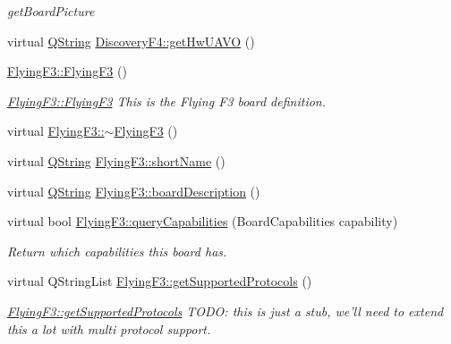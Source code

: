 \begin{DoxyCompactItemize}
\begin{DoxyCompactList}\small\item\em get\-Board\-Picture \end{DoxyCompactList}\item 
virtual \hyperlink{group___u_a_v_objects_plugin_gab9d252f49c333c94a72f97ce3105a32d}{\-Q\-String} \hyperlink{group___boards___stm_gad4fb3147a8ceb8b1106048d7b44d92e9}{\-Discovery\-F4\-::get\-Hw\-U\-A\-V\-O} ()
\item 
\hyperlink{group___boards___stm_ga9b44241cce2e1f0737c9fef2eace273b}{\-Flying\-F3\-::\-Flying\-F3} ()
\begin{DoxyCompactList}\small\item\em \hyperlink{group___boards___stm_ga9b44241cce2e1f0737c9fef2eace273b}{\-Flying\-F3\-::\-Flying\-F3} \-This is the \-Flying \-F3 board definition. \end{DoxyCompactList}\item 
virtual \hyperlink{group___boards___stm_ga23437724f5332cc76950a41249c6d968}{\-Flying\-F3\-::$\sim$\-Flying\-F3} ()
\item 
virtual \hyperlink{group___u_a_v_objects_plugin_gab9d252f49c333c94a72f97ce3105a32d}{\-Q\-String} \hyperlink{group___boards___stm_ga968d0cdefdfe42c8f2dfbc4cafca72f2}{\-Flying\-F3\-::short\-Name} ()
\item 
virtual \hyperlink{group___u_a_v_objects_plugin_gab9d252f49c333c94a72f97ce3105a32d}{\-Q\-String} \hyperlink{group___boards___stm_ga76b7c5c83fb46e122a100ae0ef5fae8f}{\-Flying\-F3\-::board\-Description} ()
\item 
virtual bool \hyperlink{group___boards___stm_ga92cb3b23d790b1b3aadab14c830412f3}{\-Flying\-F3\-::query\-Capabilities} (\-Board\-Capabilities capability)
\begin{DoxyCompactList}\small\item\em \-Return which capabilities this board has. \end{DoxyCompactList}\item 
virtual \-Q\-String\-List \hyperlink{group___boards___stm_ga96db192be19ed6a7af49c8668cf4ff36}{\-Flying\-F3\-::get\-Supported\-Protocols} ()
\begin{DoxyCompactList}\small\item\em \hyperlink{group___boards___stm_ga96db192be19ed6a7af49c8668cf4ff36}{\-Flying\-F3\-::get\-Supported\-Protocols} \-T\-O\-D\-O\-: this is just a stub, we'll need to extend this a lot with multi protocol support. \end{DoxyCompactList}\item 

\end{DoxyCompactItemize}
